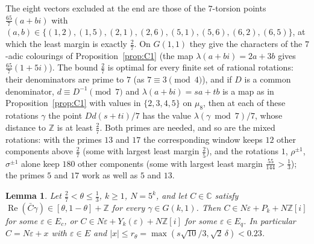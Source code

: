 \documentclass[11pt,a4paper]{amsart}
\newtheorem{lemma}{Lemma}
\theoremstyle{remark}
\newcommand{\Z}{\mathbb{Z}}
\newcommand{\C}{\mathbb{C}}
\begin{document}
The eight vectors excluded at the end are those of the $7$-torsion points $\frac{65}7(a+bi)$ with
$(a,b)\in\{(1,2),(1,5),(2,1),(2,6),(5,1),(5,6),(6,2),(6,5)\}$, at which the least margin is exactly $\frac27$. On
$G(1,1)$ they give the characters of the $7$-adic colourings of Proposition~\ref{prop:C1} (the map
$\lambda(a+bi)=2a+3b$ gives $\frac{65}7(1+5i)$). The bound $\frac27$ is optimal for every finite set of rational
rotations: their denominators are prime to $7$ (as $7\equiv3\pmod4$), and if $D$ is a common denominator,
$d\equiv D^{-1}\pmod7$ and $\lambda(a+bi)=sa+tb$ is a map as in Proposition~\ref{prop:C1} with values in
$\{2,3,4,5\}$ on $\mu_8$, then at each of these rotations $\gamma$ the point $Dd(s+ti)/7$ has the value
$\lambda(\gamma\bmod7)/7$, whose distance to $\Z$ is at least $\frac27$. Both primes are needed, and so are the mixed rotations: with the primes $13$ and $17$ the
corresponding window keeps $12$ other components above $\frac27$ (some with largest least margin $\frac25$), and the
rotations $1$, $\rho^{\pm1}$, $\sigma^{\pm1}$ alone keep $180$ other components (some with largest least margin
$\frac{55}{144}>\frac13$); the primes $5$ and
$17$ work as well as $5$ and $13$.

\begin{lemma}\label{lem:window}
Let $\frac27<\theta\le\frac13$, $k\ge1$, $N=5^k$, and let $C\in\C$ satisfy
$\operatorname{Re}(\bar C\gamma)\in[\theta,1-\theta]+\Z$ for every $\gamma\in G(k,1)$. Then
$C\in N\varepsilon+P_k+N\Z[i]$ for some $\varepsilon\in E_c$, or $C\in N\varepsilon+Y_k(\varepsilon)+N\Z[i]$ for some
$\varepsilon\in E_q$. In particular $C=N\varepsilon+x$ with $\varepsilon\in E$ and
$|x|\le r_\theta=\max(s\sqrt{10}/3,\sqrt2\,\delta)<0.23$.
\end{lemma}
\end{document}
